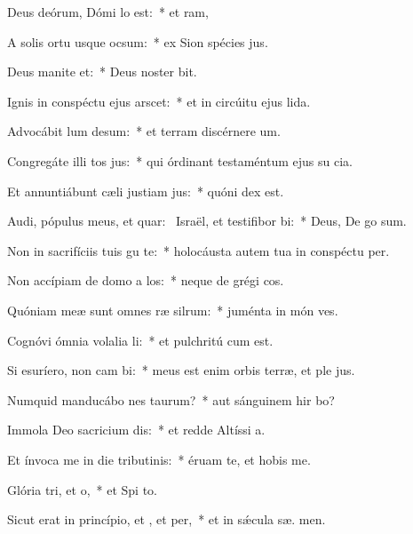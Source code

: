 \item Deus deórum, Dómi lo est:~* et  ram,
\item A solis ortu usque  ocsum:~* ex Sion spécies  jus.
\item Deus manite et:~* Deus noster   bit.
\item Ignis in conspéctu ejus arscet:~* et in circúitu ejus  lida.
\item Advocábit lum desum:~* et terram discérnere  um.
\item Congregáte illi tos jus:~* qui órdinant testaméntum ejus su cia.
\item Et annuntiábunt cæli justiam jus:~* quóni  dex est.
\item Audi, pópulus meus, et quar:~\pscross{} Israël, et testifibor bi:~* Deus, De  go sum.
\item Non in sacrifíciis tuis gu te:~* holocáusta autem tua in conspéctu   per.
\item Non accípiam de domo a los:~* neque de grégi  cos.
\item Quóniam meæ sunt omnes ræ silrum:~* juménta in món  ves.
\item Cognóvi ómnia volalia li:~* et pulchritú  cum est.
\item Si esuríero, non cam bi:~* meus est enim orbis terræ, et ple jus.
\item Numquid manducábo nes taurum?~* aut sánguinem hir bo?
\item Immola Deo sacricium dis:~* et redde Altíssi  a.
\item Et ínvoca me in die tributinis:~* éruam te, et hobis me.
\item Glória tri, et o,~* et Spi to.
\item Sicut erat in princípio, et , et per,~* et in sǽcula sæ. men.
